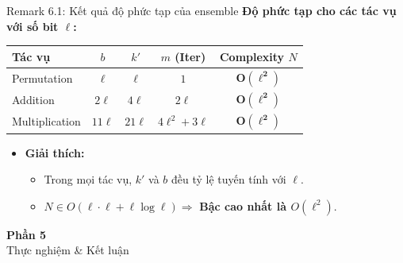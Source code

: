 \begin{frame}{Remark 6.1: Kết quả độ phức tạp của ensemble}
    \textbf{Độ phức tạp cho các tác vụ với số bit $\ell$:} 
    
    \begin{center}
    \renewcommand{\arraystretch}{1.2}
    \begin{tabular}{|l|c|c|c|c|}
        \hline
        \textbf{Tác vụ} & $b$ & $k'$ & $m$ (Iter) & \textbf{Complexity $N$} \\
        \hline
        Permutation & $\ell$ & $\ell$ & $1$ & $\mathbf{O(\ell^2)}$ \\
        Addition & $2\ell$ & $4\ell$ & $2\ell$ & $\mathbf{O(\ell^2)}$ \\
        Multiplication & $11\ell$ & $21\ell$ & $4\ell^2 + 3\ell$ & $\mathbf{O(\ell^2)}$ \\
        \hline
    \end{tabular}
    \end{center}

    \begin{itemize}
        \item \textbf{Giải thích:} 
            \begin{itemize}
                \item Trong mọi tác vụ, $k'$ và $b$ đều tỷ lệ tuyến tính với $\ell$.
                \item $N \in O(\ell \cdot \ell + \ell \log \ell) \Rightarrow$ \textbf{Bậc cao nhất là $O(\ell^2)$}.
            \end{itemize}
    \end{itemize}
\end{frame}





\begin{frame}{}
  \centering
  \vfill
  {\Huge \textbf{Phần 5}}\\[0.5cm]
  {\Large Thực nghiệm \& Kết luận}
  \vfill
\end{frame}
